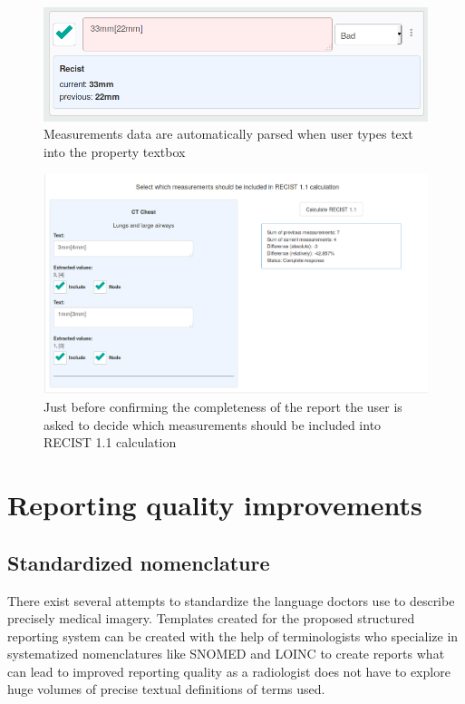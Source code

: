 \documentclass[12pt, twoside, openany]{report}
\theoremstyle{definition}
\begin{document}
\begin{figure}
	\centering
	\includegraphics[width=0.8\linewidth]{recist-parsing}
	\caption{Measurements data are automatically parsed when user types text into the property textbox
		\label{fig:recist-parsing}
	}
\end{figure}

\begin{figure}
	\centering
	\includegraphics[width=\linewidth]{recist-config}
	\caption{Just before confirming the completeness of the report the user is asked to decide which measurements should be included into RECIST 1.1 calculation\protect\footnotemark
		\label{fig:recist-config}}
\end{figure}


\section{Reporting quality improvements}
\subsection{Standardized nomenclature}
There exist several attempts to standardize the language doctors use to describe precisely medical imagery. Templates created for the proposed structured reporting system can be created with the help of terminologists who specialize in systematized nomenclatures like SNOMED and LOINC to create reports what can lead to improved reporting quality as a radiologist does not have to explore huge volumes of precise textual definitions of terms used. 
\end{document}
